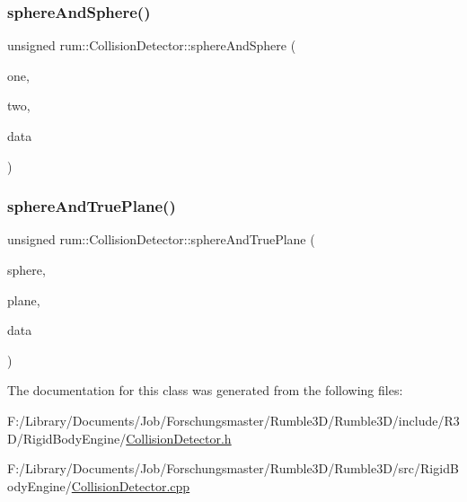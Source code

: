 \mbox{\label{classrum_1_1_collision_detector_a9498c9f732f1df8ae84c8be081a04bee}} 
\subsubsection{\texorpdfstring{sphere\+And\+Sphere()}{sphereAndSphere()}}
{\footnotesize\ttfamily unsigned rum\+::\+Collision\+Detector\+::sphere\+And\+Sphere (\begin{DoxyParamCaption}\item[{const \hyperlink{classrum_1_1_collision_sphere}{Collision\+Sphere} \&}]{one,  }\item[{const \hyperlink{classrum_1_1_collision_sphere}{Collision\+Sphere} \&}]{two,  }\item[{\hyperlink{classrum_1_1_collision_data}{Collision\+Data} $\ast$}]{data }\end{DoxyParamCaption})\hspace{0.3cm}{\ttfamily [static]}}

\mbox{\label{classrum_1_1_collision_detector_a7e5d21b3b21f19ab68f9dfbbff321864}} 
\subsubsection{\texorpdfstring{sphere\+And\+True\+Plane()}{sphereAndTruePlane()}}
{\footnotesize\ttfamily unsigned rum\+::\+Collision\+Detector\+::sphere\+And\+True\+Plane (\begin{DoxyParamCaption}\item[{const \hyperlink{classrum_1_1_collision_sphere}{Collision\+Sphere} \&}]{sphere,  }\item[{const \hyperlink{classrum_1_1_collision_plane}{Collision\+Plane} \&}]{plane,  }\item[{\hyperlink{classrum_1_1_collision_data}{Collision\+Data} $\ast$}]{data }\end{DoxyParamCaption})\hspace{0.3cm}{\ttfamily [static]}}



The documentation for this class was generated from the following files\+:\begin{DoxyCompactItemize}
\item 
F\+:/\+Library/\+Documents/\+Job/\+Forschungsmaster/\+Rumble3\+D/\+Rumble3\+D/include/\+R3\+D/\+Rigid\+Body\+Engine/\hyperlink{_collision_detector_8h}{Collision\+Detector.\+h}\item 
F\+:/\+Library/\+Documents/\+Job/\+Forschungsmaster/\+Rumble3\+D/\+Rumble3\+D/src/\+Rigid\+Body\+Engine/\hyperlink{_collision_detector_8cpp}{Collision\+Detector.\+cpp}\end{DoxyCompactItemize}
